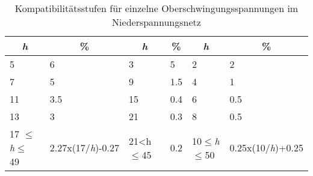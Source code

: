 \begin{table}[ht!]
{\begin{tabular}{|l|l|l|l|l|l|}
			\multicolumn{1}{|c|}{\textit{h}}                                                                  & \multicolumn{1}{c|}{\%}                                                              & \multicolumn{1}{c|}{\textit{h}}                                                                     & \multicolumn{1}{c|}{\%}                                                              & \multicolumn{1}{c|}{\textit{h}}                                                                     & \multicolumn{1}{c|}{\%}                                                              \\ \hline
			
			5                                                         & 6                                                     & 3                                                       & 5                                                & 2                                           & 2                                         \\
			7                                                         & 5                                                     & 9                                                       & 1.5                                              & 4                                           & 1                                         \\
			11                                                        & 3.5                                                   & 15                                                      & 0.4                                              & 6                                           & 0.5                                       \\
			13                                                        & 3                                                     & 21                                                      & 0.3                                              & 8                                           & 0.5                                       \\
			17 $\leq$\textit{h}$\leq$ 49                                                   & 2.27x(17/\textit{h})-0.27                                   & 21<h$\leq$45                                                 & 0.2                                              & 10$\leq$\textit{h}$\leq$50                                     & 0.25x(10/\textit{h})+0.25                       \\ \hline
	\end{tabular}}
	\caption{Kompatibilitätsstufen für einzelne Oberschwingungsspannungen im Niederspannungsnetz}\label{tab:kompatibilitätsstufen}
\end{table}

